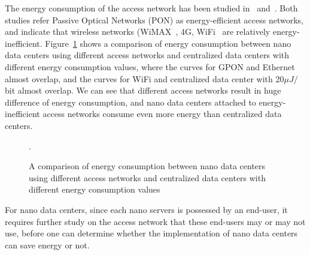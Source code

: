 The energy consumption of the access network has been studied in~\cite{DBLP:journals/sigmetrics/JalaliAVHAT14} and~\cite{accessNetwork}.
Both studies refer Passive Optical Networks (PON) as energy-efficient access networks,
and indicate that wireless networks (WiMAX~\cite{accessNetwork}, 4G, WiFi~\cite{DBLP:journals/sigmetrics/JalaliAVHAT14} are relatively energy-inefficient.
Figure~\ref{fig:accessNet} shows a comparison of energy consumption between nano data centers using different access networks and centralized data centers with different energy consumption values,
where the curves for GPON and Ethernet almost overlap, and the curves for WiFi and centralized data center with 20$\mu J/$bit almost overlap.
We can see that different access networks result in huge difference of energy consumption,
and nano data centers attached to energy-inefficient access networks consume even more energy than centralized data centers.
 
\begin{figure}[h]
	\fontsize{12}{12} \selectfont
	\centerline{}
	\caption{A comparison of energy consumption between nano data centers using different access networks and centralized data centers with different energy consumption values~\cite{DBLP:conf/conext/ValanciusLMDR09}}.
	\label{fig:accessNet}
	\normalsize
\end{figure}

For nano data centers,
since each nano servers is possessed by an end-user,
it requires further study on the access network that these end-users may or may not use,
before one can determine whether the implementation of nano data centers can save energy or not.

